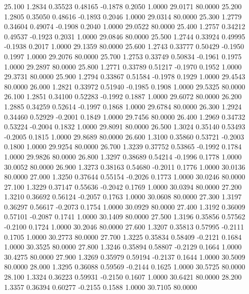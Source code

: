   25.100   1.2834   0.35523   0.48165  -0.1878   0.2050   1.0000  29.0171  80.0000
  25.200   1.2805   0.35050   0.48616  -0.1893   0.2046   1.0000  29.0314  80.0000
  25.300   1.2779   0.34604   0.49074  -0.1908   0.2040   1.0000  29.0522  80.0000
  25.400   1.2757   0.34212   0.49537  -0.1923   0.2031   1.0000  29.0846  80.0000
  25.500   1.2744   0.33924   0.49995  -0.1938   0.2017   1.0000  29.1359  80.0000
  25.600   1.2743   0.33777   0.50429  -0.1950   0.1997   1.0000  29.2076  80.0000
  25.700   1.2753   0.33749   0.50834  -0.1961   0.1975   1.0000  29.2897  80.0000
  25.800   1.2771   0.33789   0.51217  -0.1970   0.1952   1.0000  29.3731  80.0000
  25.900   1.2794   0.33867   0.51584  -0.1978   0.1929   1.0000  29.4543  80.0000
  26.000   1.2821   0.33972   0.51940  -0.1985   0.1908   1.0000  29.5325  80.0000
  26.100   1.2851   0.34100   0.52283  -0.1992   0.1887   1.0000  29.6072  80.0000
  26.200   1.2885   0.34259   0.52614  -0.1997   0.1868   1.0000  29.6784  80.0000
  26.300   1.2924   0.34460   0.52929  -0.2001   0.1849   1.0000  29.7456  80.0000
  26.400   1.2969   0.34732   0.53224  -0.2004   0.1832   1.0000  29.8091  80.0000
  26.500   1.3024   0.35140   0.53493  -0.2005   0.1815   1.0000  29.8689  80.0000
  26.600   1.3100   0.35860   0.53721  -0.2003   0.1800   1.0000  29.9254  80.0000
  26.700   1.3239   0.37752   0.53865  -0.1992   0.1784   1.0000  29.9826  80.0000
  26.800   1.3297   0.38689   0.54214  -0.1996   0.1778   1.0000  30.0052  80.0000
  26.900   1.3273   0.38163   0.54680  -0.2011   0.1776   1.0000  30.0136  80.0000
  27.000   1.3250   0.37644   0.55154  -0.2026   0.1773   1.0000  30.0246  80.0000
  27.100   1.3229   0.37147   0.55636  -0.2042   0.1769   1.0000  30.0394  80.0000
  27.200   1.3210   0.36692   0.56124  -0.2057   0.1763   1.0000  30.0608  80.0000
  27.300   1.3197   0.36297   0.56617  -0.2073   0.1754   1.0000  30.0929  80.0000
  27.400   1.3192   0.36009   0.57101  -0.2087   0.1741   1.0000  30.1409  80.0000
  27.500   1.3196   0.35856   0.57562  -0.2100   0.1724   1.0000  30.2046  80.0000
  27.600   1.3207   0.35813   0.57995  -0.2111   0.1705   1.0000  30.2773  80.0000
  27.700   1.3225   0.35834   0.58409  -0.2121   0.1684   1.0000  30.3525  80.0000
  27.800   1.3246   0.35894   0.58807  -0.2129   0.1664   1.0000  30.4275  80.0000
  27.900   1.3269   0.35979   0.59194  -0.2137   0.1644   1.0000  30.5009  80.0000
  28.000   1.3295   0.36088   0.59569  -0.2144   0.1625   1.0000  30.5725  80.0000
  28.100   1.3324   0.36223   0.59931  -0.2150   0.1607   1.0000  30.6421  80.0000
  28.200   1.3357   0.36394   0.60277  -0.2155   0.1588   1.0000  30.7105  80.0000
